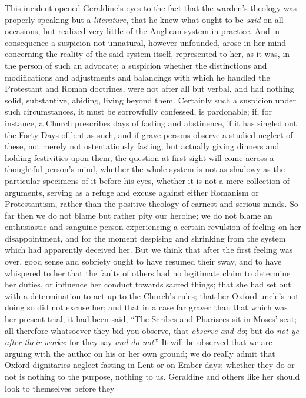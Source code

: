 This incident opened Geraldine's eyes to the fact
that the warden's theology was properly speaking but a \emph{literature},
that he knew what ought to be \emph{said} on all occasions, but realized
very little of the Anglican system in practice. And in consequence a
suspicion not unnatural, however unfounded, arose in her mind concerning
the reality of the said system itself, represented to her, as it was, in
the person of such an advocate; a suspicion whether the distinctions and
modifications and adjustments and balancings with which he handled the
Protestant and Roman doctrines, were not after all but verbal, and had
nothing solid, substantive, abiding, living beyond them. Certainly such
a suspicion under such circumstances, it must be sorrowfully confessed,
is pardonable; if, for instance, a Church prescribes days of fasting and
abstinence, if it has singled out the Forty Days of lent as such, and if
grave persons observe a studied neglect of these, not merely not
ostentatiously fasting, but actually giving dinners and holding
festivities upon them, the question at first sight will come across a
thoughtful person's mind, whether the whole system is not as shadowy as
the particular specimens of it before his eyes, whether it is not a mere
collection of arguments, serving as a refuge and excuse against either
Romanism or Protestantism, rather than the positive theology of earnest
and serious minds. So far then we do not blame but rather pity our
heroine; we do not blame an enthusiastic and sanguine person
experiencing a certain revulsion of feeling on her disappointment, and
for the moment despising and shrinking from the system which had
apparently deceived her. But we think that after the first feeling was
over, good sense and sobriety ought to have resumed their sway, and to
have whispered to her that the faults of others had no legitimate claim
to determine her duties, or influence her conduct towards sacred things;
that she had set out with a determination to act up to the Church's
rules; that her Oxford uncle's not doing so did not excuse her; and that
in a case far graver than that which was her present trial, it had been
said, ``The Scribes and Pharisees sit in Moses' seat; all therefore
whatsoever they bid you observe, that \emph{observe and do}; but do \emph{not
ye after their works}: for they say \emph{and do not}.'' It will be
observed that we are arguing with the author on his or her own ground;
we do really admit that Oxford dignitaries neglect fasting in Lent or on
Ember days; whether they do or not is nothing to the purpose, nothing to
us. Geraldine and others like her should look to themselves before they
